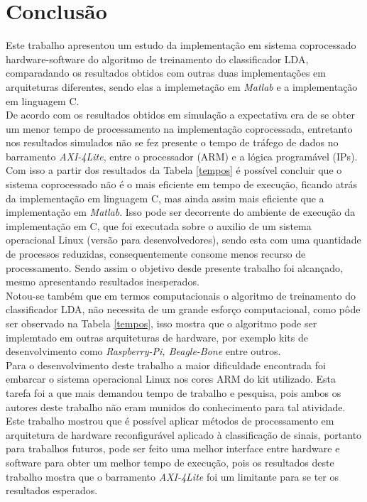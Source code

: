 \chapter[Conclusao]{Conclusão}

Este trabalho apresentou um estudo da implementação em sistema coprocessado hardware-software do algoritmo de treinamento do classificador LDA, comparadando os resultados obtidos com outras duas implementações em arquiteturas diferentes, sendo elas a implemetação em \textit{Matlab} \cite{F.Lotte} e a implementação em linguagem C.\\

De acordo com os resultados obtidos em simulação a expectativa era de se obter um menor tempo de processamento na implementação coprocessada, entretanto nos resultados simulados não se fez presente o tempo de tráfego de dados no barramento \textit{AXI-4Lite}, entre o processador (ARM) e a lógica programável (IPs). Com isso a partir dos resultados da Tabela \ref{tempos} é possível concluir que o sistema coprocessado não é o mais eficiente em tempo de execução, ficando atrás da implementação em linguagem C, mas ainda assim mais eficiente que a implementação em \textit{Matlab}. Isso pode ser decorrente do ambiente de execução da implementação em C, que foi executada sobre o auxilio de um sistema operacional Linux (versão para desenvolvedores), sendo esta com uma quantidade de processos reduzidas, consequentemente consome menos recurso de processamento. Sendo assim o objetivo desde presente trabalho foi
alcançado, mesmo apresentando resultados inesperados.\\

Notou-se também que em termos computacionais o algoritmo de treinamento do classificador LDA, não necessita de um grande esforço computacional, como pôde ser observado na Tabela \ref{tempos}, isso mostra que o algoritmo pode ser implemtado em outras arquiteturas de hardware, por exemplo kits de desenvolvimento como \textit{Raspberry-Pi, Beagle-Bone} entre outros.\\

Para o desenvolvimento deste trabalho a maior dificuldade encontrada foi embarcar o sistema operacional Linux nos cores ARM do kit utilizado. Esta tarefa foi a que mais demandou tempo de trabalho e pesquisa, pois ambos os autores deste trabalho não eram munidos do conhecimento para tal atividade. \\

Este trabalho mostrou que é possível aplicar métodos de processamento em arquitetura de hardware reconfigurável aplicado à classificação de sinais, portanto para trabalhos futuros, pode ser feito uma melhor interface entre hardware e software para obter um melhor tempo de execução, pois os resultados deste trabalho mostra que o barramento \textit{AXI-4Lite} foi um limitante para se ter os resultados esperados. 

